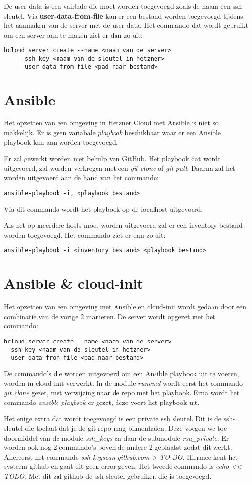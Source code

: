 De user data is een vairbale die moet worden toegevoegd zoals de naam een ssh sleutel. Via \textbf{user-data-from-file} kan er een bestand worden toegevoegd tijdens het aanmaken van de server met de user data. Het commando dat wordt gebruikt om een server aan te maken ziet er dan zo uit:
\begin{lstlisting}
hcloud server create --name <naam van de server> 
    --ssh-key <naam van de sleutel in hetzner>
    --user-data-from-file <pad naar bestand>
\end{lstlisting}

\section{Ansible}
Het opzetten van een omgeving in Hetzner Cloud met Ansible is niet zo makkelijk. Er is geen variabale \textit{playbook} beschikbaar waar er een Ansible playbook kan aan worden toegevoegd.

Er zal gewerkt worden met behulp van GitHub. Het playbook dat wordt uitgevoerd, zal worden verkregen met een \textit{git clone} of \textit{git pull}. Daarna zal het worden uitgevoerd aan de hand van het commando:
\begin{lstlisting}
ansible-playbook -i, <playbook bestand>
\end{lstlisting}
Via dit commando wordt het playbook op de localhost uitgevoerd. 

Als het op meerdere hosts moet worden uitgevoerd zal er een inventory bestand worden toegevoegd. Het commando ziet er dan zo uit:
\begin{lstlisting}
ansible-playbook -i <inventory bestand> <playbook bestand>
\end{lstlisting}

\newpage
\section{Ansible \& cloud-init}
Het opzetten van een omgeving met Ansible en cloud-init wordt gedaan door een combinatie van de vorige 2 manieren. De server wordt opgezet met het commando:
\begin{lstlisting}
hcloud server create --name <naam van de server> 
--ssh-key <naam van de sleutel in hetzner>
--user-data-from-file <pad naar bestand>
\end{lstlisting}
De commando's die worden uitgevoerd om een Ansible playbook uit te voeren, worden in cloud-init verwerkt. In de module \textit{runcmd} wordt eerst het commando \textit{git clone} gezet, met verwijzing naar de repo met het playbook. Erna wordt het commando \textit{ansible-playbook} er gezet, deze voert het playbook uit.

Het enige extra dat wordt toegevoegd is een private ssh sleutel. Dit is de ssh-sleutel die toelaat dat je de git repo mag binnenhalen. Deze voegen we toe doormiddel van de module \textit{ssh\_keys} en daar de submodule \textit{rsa\_private}. Er worden ook nog 2 commando's boven de andere 2 geplaatst zodat dit werkt. Allereerst het commando \textit{ssh-keyscan github.com > TO DO}. Hiermee kent het systeem github en gaat dit geen error geven. Het tweede commando is \textit{echo << TODO}. Met dit zal github de ssh sleutel gebruiken die is toegevoegd.
